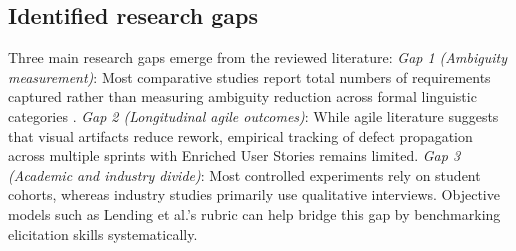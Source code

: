 \subsection{Identified research gaps}
Three main research gaps emerge from the reviewed literature:
\textit{Gap 1 (Ambiguity measurement)}: Most comparative studies report total numbers of requirements captured rather than measuring ambiguity reduction across formal linguistic categories \cite{berry2003contract, cascon2025ambiguity}.
\textit{Gap 2 (Longitudinal agile outcomes)}: While agile literature suggests that visual artifacts reduce rework, empirical tracking of defect propagation across multiple sprints with Enriched User Stories \cite{acm2022proposal, inayat2015systematic} remains limited.
\textit{Gap 3 (Academic and industry divide)}: Most controlled experiments rely on student cohorts, whereas industry studies primarily use qualitative interviews. Objective models such as Lending et al.'s rubric \cite{lending2022rubric} can help bridge this gap by benchmarking elicitation skills systematically.
